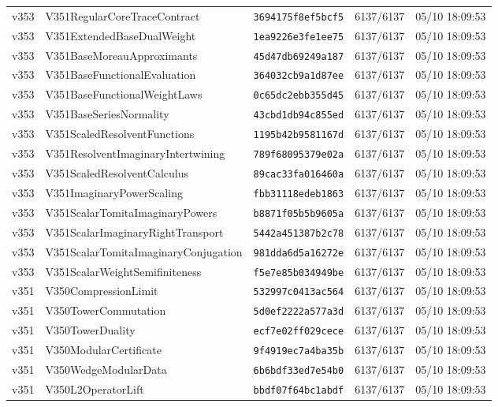 \documentclass[11pt]{article}
\theoremstyle{definition}\newtheorem{deriv}{Derivation}
\begin{document}
{\begin{longtable}{@{}lllll@{}}
v353 & V351RegularCoreTraceContract & \texttt{3694175f8ef5bcf5} & 6137/6137 & 05/10 18:09:53 \\
v353 & V351ExtendedBaseDualWeight & \texttt{1ea9226e3fe1ee75} & 6137/6137 & 05/10 18:09:53 \\
v353 & V351BaseMoreauApproximants & \texttt{45d47db69249a187} & 6137/6137 & 05/10 18:09:53 \\
v353 & V351BaseFunctionalEvaluation & \texttt{364032cb9a1d87ee} & 6137/6137 & 05/10 18:09:53 \\
v353 & V351BaseFunctionalWeightLaws & \texttt{0c65dc2ebb355d45} & 6137/6137 & 05/10 18:09:53 \\
v353 & V351BaseSeriesNormality & \texttt{43cbd1db94c855ed} & 6137/6137 & 05/10 18:09:53 \\
v353 & V351ScaledResolventFunctions & \texttt{1195b42b9581167d} & 6137/6137 & 05/10 18:09:53 \\
v353 & V351ResolventImaginaryIntertwining & \texttt{789f68095379e02a} & 6137/6137 & 05/10 18:09:53 \\
v353 & V351ScaledResolventCalculus & \texttt{89cac33fa016460a} & 6137/6137 & 05/10 18:09:53 \\
v353 & V351ImaginaryPowerScaling & \texttt{fbb31118edeb1863} & 6137/6137 & 05/10 18:09:53 \\
v353 & V351ScalarTomitaImaginaryPowers & \texttt{b8871f05b5b9605a} & 6137/6137 & 05/10 18:09:53 \\
v353 & V351ScalarImaginaryRightTransport & \texttt{5442a451387b2c78} & 6137/6137 & 05/10 18:09:53 \\
v353 & V351ScalarTomitaImaginaryConjugation & \texttt{981dda6d5a16272e} & 6137/6137 & 05/10 18:09:53 \\
v353 & V351ScalarWeightSemifiniteness & \texttt{f5e7e85b034949be} & 6137/6137 & 05/10 18:09:53 \\
v351 & V350CompressionLimit & \texttt{532997c0413ac564} & 6137/6137 & 05/10 18:09:53 \\
v351 & V350TowerCommutation & \texttt{5d0ef2222a577a3d} & 6137/6137 & 05/10 18:09:53 \\
v351 & V350TowerDuality & \texttt{ecf7e02ff029cece} & 6137/6137 & 05/10 18:09:53 \\
v351 & V350ModularCertificate & \texttt{9f4919ec7a4ba35b} & 6137/6137 & 05/10 18:09:53 \\
v351 & V350WedgeModularData & \texttt{6b6bdf33ed7e54b0} & 6137/6137 & 05/10 18:09:53 \\
v351 & V350L2OperatorLift & \texttt{bbdf07f64bc1abdf} & 6137/6137 & 05/10 18:09:53 \\

\end{longtable}}
\end{document}
